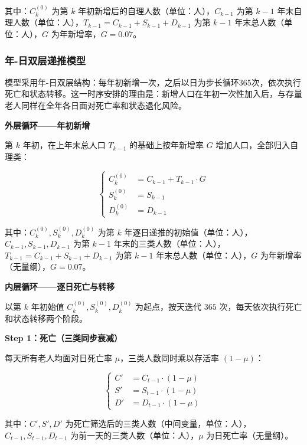 \documentclass[12pt,a4paper]{article}
\begin{document}
其中：$C_{k}^{(0)}$ 为第 $k$ 年初新增后的自理人数（单位：人），$C_{k-1}$ 为第 $k-1$ 年末自理人数（单位：人），$T_{k-1}=C_{k-1}+S_{k-1}+D_{k-1}$ 为第 $k-1$ 年末总人数（单位：人），$G$ 为年新增率，$G=0.07$。

\subsubsection{年-日双层递推模型}

模型采用年-日双层结构：每年初新增一次，之后以日为步长循环365次，依次执行死亡和状态转移。这一时序安排的理由是：新增人口在年初一次性加入后，与存量老人同样在全年各日面对死亡率和状态退化风险。

\noindent\textbf{外层循环——年初新增}

第 $k$ 年初，在上年末总人口 $T_{k-1}$ 的基础上按年新增率 $G$ 增加人口，全部归入自理类：

\begin{equation}
\left\{
\begin{aligned}
C_k^{(0)} &= C_{k-1} + T_{k-1} \cdot G \\
S_k^{(0)} &= S_{k-1} \\
D_k^{(0)} &= D_{k-1}
\end{aligned}
\right.
\tag{1.8}
\end{equation}

其中：$C_k^{(0)}, S_k^{(0)}, D_k^{(0)}$ 为第 $k$ 年逐日递推的初始值（单位：人），$C_{k-1}, S_{k-1}, D_{k-1}$ 为第 $k-1$ 年末的三类人数（单位：人），$T_{k-1} = C_{k-1} + S_{k-1} + D_{k-1}$ 为第 $k-1$ 年末总人数（单位：人），$G$ 为年新增率（无量纲），$G=0.07$。

\noindent\textbf{内层循环——逐日死亡与转移}

以第 $k$ 年初始值 $C_k^{(0)}, S_k^{(0)}, D_k^{(0)}$ 为起点，按天迭代 $365$ 次，每天依次执行死亡和状态转移两个阶段。

\noindent\textbf{Step 1：死亡（三类同步衰减）}

每天所有老人均面对日死亡率 $\mu$，三类人数同时乘以存活率 $(1-\mu)$：

\begin{equation}
\left\{
\begin{aligned}
C' &= C_{t-1} \cdot (1 - \mu) \\
S' &= S_{t-1} \cdot (1 - \mu) \\
D' &= D_{t-1} \cdot (1 - \mu)
\end{aligned}
\right.
\tag{1.9}
\end{equation}

其中：$C', S', D'$ 为死亡筛选后的三类人数（中间变量，单位：人），$C_{t-1}, S_{t-1}, D_{t-1}$ 为前一天的三类人数（单位：人），$\mu$ 为日死亡率（无量纲）。
\end{document}
